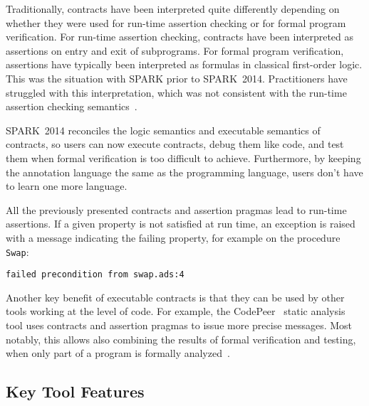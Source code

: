 \documentclass[10pt,a4paper,twocolumn]{article}
\newcommand{\newspark}{SPARK~2014\xspace}
\newcommand{\SPARK}[1]{\lstinline[language=Ada,basicstyle={\footnotesize
      \sffamily},framesep=0pt]$#1$}
\begin{document}
Traditionally, contracts have been interpreted quite differently depending on
whether they were used for run-time assertion checking or for formal program
verification. For run-time assertion checking, contracts have been interpreted
as assertions on entry and exit of subprograms. For formal program
verification, assertions have typically been interpreted as formulas in
classical first-order logic. This was the situation with SPARK prior to
\newspark. Practitioners have struggled with this interpretation, which was not
consistent with the run-time assertion checking semantics~\cite{tseChalin10}.

\newspark reconciles the logic semantics and executable semantics of contracts,
so users can now execute contracts, debug them like code, and test them when
formal verification is too difficult to achieve. Furthermore, by keeping the
annotation language the same as the programming language, users don't have to
learn one more language.

All the previously presented contracts and assertion
pragmas lead to run-time assertions. If a given property
is not satisfied at run time, an exception is raised with a message indicating
the failing property, for example on the procedure \SPARK{Swap}:

\begin{footnotesize}
\begin{verbatim}
failed precondition from swap.ads:4
\end{verbatim}
\end{footnotesize}


Another key benefit of executable contracts is that they can be used by other
tools working at the level of code. For example, the CodePeer~\cite{codepeer}
static analysis tool uses contracts and assertion pragmas to issue more precise
messages. Most notably, this allows also combining the results of formal
verification and testing, when only part of a program is formally
analyzed~\cite{hiliteERTS2012}.

\subsection{Key Tool Features}
\end{document}
